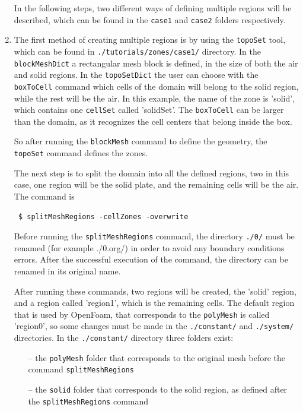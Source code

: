 \documentclass{article}
\newcommand\tab[1][0.5cm]{\hspace*{#1}}
\begin{document}
\begin{enumerate}[3.1]
	In the following steps, two different ways of defining multiple regions will be described, which can be found in the {\tt case1} and {\tt case2} folders respectively.
	
	\item The first method of creating multiple regions is by using the {\tt topoSet} tool, which can be found in {\tt ./tutorials/zones/case1/} directory. In the {\tt blockMeshDict} a rectangular mesh block is defined, in the size of both the air and solid regions. In the {\tt topoSetDict} the user can choose with the {\tt boxToCell} command which cells of the domain will belong to the solid region, while the rest will be the air. In this example, the name of the zone is 'solid', which contains one {\tt cellSet} called 'solidSet'. The {\tt boxToCell} can be larger than the domain, as it recognizes the cell centers that belong inside the box.
	
	So after running the {\tt blockMesh} command to define the geometry, the {\tt topoSet} command defines the zones.
	
	The next step is to split the domain into all the defined regions, two in this case, one region will be the solid plate, and the remaining cells will be the air. The command is
	
	{\tt
	\tab \$ splitMeshRegions -cellZones -overwrite
	}

	Before running the {\tt splitMeshRegions} command, the directory {\tt ./0/} must be renamed (for example ./0.org/) in order to avoid any boundary conditions errors. After the successful execution of the command, the directory can be renamed in its original name.
	
	After running these commands, two regions will be created, the 'solid' region, and a region called 'region1', which is the remaining cells. The default region that is used by OpenFoam, that corresponds to the {\tt polyMesh} is called 'region0', so some changes must be made in the {\tt ./constant/} and {\tt ./system/} directories. In the {\tt ./constant/} directory three folders exist:
	
	\begin{itemize}
		\item[--] the {\tt polyMesh} folder that corresponds to the original mesh before the command {\tt splitMeshRegions}
		
		\item[--] the {\tt solid} folder that corresponds to the solid region, as defined after the {\tt splitMeshRegions} command
		

\end{itemize}
\end{enumerate}
\end{document}
